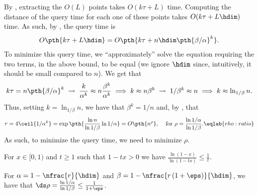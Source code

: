 By , extracting the $O(L)$ points takes 
$O( k \tau + L)$ time. Computing the distance of the query time for
each one of these points takes $O(  k \tau + L \hdim)$ time. 
As such, by , the query time is 
\begin{align*}
    O\pth{ k \tau + L \hdim}%
    =%
    O\pth{ k \tau + n \hdim \pth{\beta/\alpha}^k }.
\end{align*}
To minimize this query time, we ``approximately'' solve the equation
requiring the two terms, in the above bound, to be equal (we ignore
$\hdim$ since, intuitively, it should be small compared to $n$).  We
get that
\begin{align*}
    k \tau = n\pth{\beta/\alpha}^k%
    \;\leadsto\;%
    \frac{k}{\alpha^k} \approx n{\frac{\beta^k}{\alpha^k}} \implies k
    \approx n\beta^k
    \;\leadsto\;%
    1/\beta^k \approx n
    \implies k \approx \ln_{1/\beta} n.
\end{align*}
Thus, setting $k = \ln_{1/\beta} n$, we have that $\beta^k = 1/n$ and,
by , that
\begin{equation}
    \tau = 4 \ceil{1/\alpha^k} = \exp\pth{ \frac{\ln n}{\ln 1/\beta}
       \ln 1/\alpha } = O \pth{ n^{ \rho }},%
    \;\;\; \text{ for }%
    \rho = \frac{\ln 1/\alpha}{ \ln 1/\beta}.
    \eqlab{rho:ratio}
\end{equation}
As such, to minimize the query time, we need to minimize $\rho$.


\begin{lemma}
    \begin{compactenumA}
        \item For $x\in[0,1)$ and $t\geq 1$ such that $1 - tx > 0$ we
        have $\displaystyle
        \frac{\ln(1-x)}{\ln(1-tx)}\leq\frac{1}{t}$.


        \item For $\alpha = 1-\nfrac{r}{\hdim}$ and $\beta = 1 -
        \nfrac{r\,(1+\eps)}{\hdim}$, we have that $\ds \rho = \frac{\ln
           1/\alpha}{ \ln 1/\beta} \leq \frac{1}{1+\eps}$.
    \end{compactenumA}
\end{lemma}

